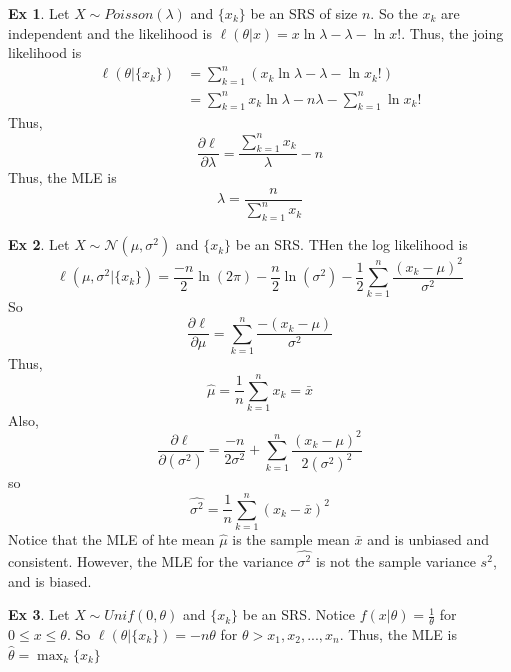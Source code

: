 \documentclass{article}
\theoremstyle{definition}\newtheorem{definition}{DEF}
\theoremstyle{definition}\newtheorem{example}{Ex}
\theoremstyle{lemma}\newtheorem{lemma}{Lemma}
\theoremstyle{corrolary}\newtheorem{corrolary}{Cor}
\begin{document}
\begin{example}
Let $X\sim Poisson(\lambda)$ and $\{x_k\}$ be an SRS of size $n$.
So the $x_k$ are independent and the likelihood is $\ell(\theta|x)=x\ln \lambda - \lambda - \ln x!$.
Thus, the joing likelihood is
\begin{align*}
\ell (\theta | \{x_k\})
&= \sum_{k=1}^n\left( x_k\ln \lambda - \lambda - \ln x_k! \right) \\
&= \sum_{k=1}^n x_k \ln \lambda - n\lambda -\sum_{k=1}^n \ln x_k!
\end{align*}
Thus,
\begin{equation*}
\frac{\partial \ell}{\partial \lambda} = \frac{\sum_{k=1}^n x_k}{\lambda} - n
\end{equation*}
Thus, the MLE is
\begin{equation*}
\hat{\lambda} = \frac{n}{\sum_{k=1}^n x_k}
\end{equation*}
\end{example}

\begin{example}
Let $X\sim \mathcal{N}(\mu, \sigma^2)$ and $\{x_k\}$ be an SRS.
THen the log likelihood is
\begin{equation}
\ell (\mu, \sigma^2 | \{x_k\}) = \frac{-n}{2}\ln (2\pi) -\frac{n}{2} \ln (\sigma^2) -\frac{1}{2} \sum_{k=1}^n \frac{(x_k - \mu)^2}{\sigma^2}
\end{equation}
So
\begin{equation}
\frac{\partial \ell}{\partial \mu} = \sum_{k=1}^n \frac{-(x_k - \mu)}{\sigma^2}
\end{equation}
Thus,
\begin{equation*}
\hat{\mu} = \frac{1}{n} \sum_{k=1}^n x_k = \bar{x}
\end{equation*}
Also,
\begin{equation*}
\frac{\partial \ell}{\partial (\sigma^2)} = \frac{-n}{2\sigma^2} + \sum_{k=1}^n \frac{(x_k - \mu)^2}{2(\sigma^2)^2}
\end{equation*}
so
\begin{equation*}
\hat{\sigma^2} = \frac{1}{n}\sum_{k=1}^n (x_k - \bar{x})^2
\end{equation*}
Notice that the MLE of hte mean $\hat{\mu}$ is the sample mean $\bar{x}$ and is unbiased and consistent.
However, the MLE for the variance $\hat{\sigma^2}$ is not the sample variance $s^2$, and is biased.
\end{example}

\begin{example}
Let $X \sim Unif(0, \theta)$ and $\{x_k\}$ be an SRS.
Notice $f(x|\theta)=\frac{1}{\theta}$ for $0\leq x \leq \theta$.
So $\ell (\theta | \{x_k\})=-n\theta$ for $\theta > x_1, x_2, ..., x_n$.
Thus, the MLE is $\hat{\theta}=\max_k \{x_k\}$
\end{example}
\end{document}
